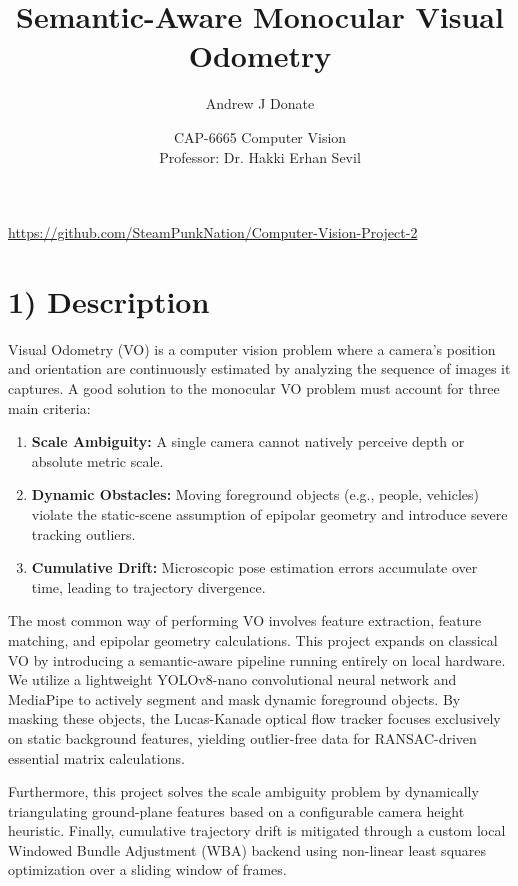 \documentclass[12pt]{article}
\title{Semantic-Aware Monocular Visual Odometry}
\author{Andrew J Donate}
\date{CAP-6665 Computer Vision \\ Professor: Dr. Hakki Erhan Sevil}
\begin{document}
\maketitle

\begin{center}
\url{https://github.com/SteamPunkNation/Computer-Vision-Project-2}
\end{center}

\section*{1) Description}

Visual Odometry (VO) is a computer vision problem where a camera's position and orientation are continuously estimated by analyzing the sequence of images it captures. A good solution to the monocular VO problem must account for three main criteria:
\begin{enumerate}
    \item \textbf{Scale Ambiguity:} A single camera cannot natively perceive depth or absolute metric scale.
    \item \textbf{Dynamic Obstacles:} Moving foreground objects (e.g., people, vehicles) violate the static-scene assumption of epipolar geometry and introduce severe tracking outliers.
    \item \textbf{Cumulative Drift:} Microscopic pose estimation errors accumulate over time, leading to trajectory divergence.
\end{enumerate}

The most common way of performing VO involves feature extraction, feature matching, and epipolar geometry calculations. This project expands on classical VO by introducing a semantic-aware pipeline running entirely on local hardware. We utilize a lightweight YOLOv8-nano convolutional neural network and MediaPipe to actively segment and mask dynamic foreground objects. By masking these objects, the Lucas-Kanade optical flow tracker focuses exclusively on static background features, yielding outlier-free data for RANSAC-driven essential matrix calculations. 

Furthermore, this project solves the scale ambiguity problem by dynamically triangulating ground-plane features based on a configurable camera height heuristic. Finally, cumulative trajectory drift is mitigated through a custom local Windowed Bundle Adjustment (WBA) backend using non-linear least squares optimization over a sliding window of frames.
\end{document}

